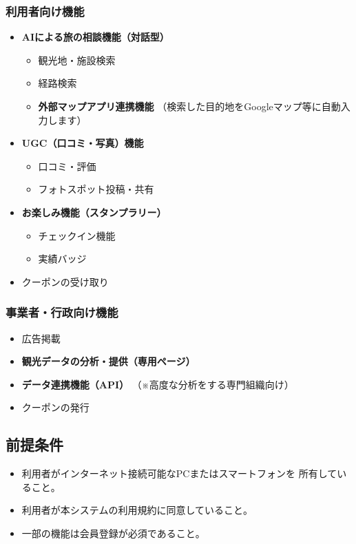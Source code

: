 \documentclass{docs}
\begin{document}
\subsubsection{利用者向け機能}
\begin{itemize}
    \item \textbf{AIによる旅の相談機能（対話型）}
    \begin{itemize}
        \item 観光地・施設検索
        \item 経路検索
        \item \textbf{外部マップアプリ連携機能}
         （検索した目的地をGoogleマップ等に自動入力します）
    \end{itemize}
    \item \textbf{UGC（口コミ・写真）機能}
    \begin{itemize}
        \item 口コミ・評価
        \item フォトスポット投稿・共有
    \end{itemize}
    \item \textbf{お楽しみ機能（スタンプラリー）}
    \begin{itemize}
        \item チェックイン機能
        \item 実績バッジ
    \end{itemize}
    \item クーポンの受け取り
\end{itemize}

\subsubsection{事業者・行政向け機能}
\begin{itemize}
    \item 広告掲載
    \item \textbf{観光データの分析・提供（専用ページ）}
    \item \textbf{データ連携機能（API）}
     （※高度な分析をする専門組織向け）
    \item クーポンの発行
\end{itemize}

\subsection{前提条件}
\begin{itemize}
    \item 利用者がインターネット接続可能なPCまたはスマートフォンを
    所有していること。
    \item 利用者が本システムの利用規約に同意していること。
    \item 一部の機能は会員登録が必須であること。
\end{itemize}
\end{document}
